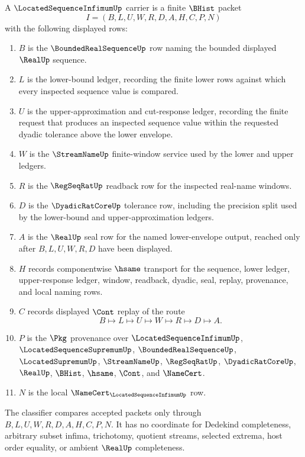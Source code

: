 \begin{definition}
\label{def:located-sequence-infimum-carrier}
A $\LocatedSequenceInfimumUp$ carrier is a finite $\BHist$ packet
$$
I=(B,L,U,W,R,D,A,H,C,P,N)
$$
with the following displayed rows:
\begin{enumerate}
\item $B$ is the $\BoundedRealSequenceUp$ row naming the bounded displayed $\RealUp$ sequence.
\item $L$ is the lower-bound ledger, recording the finite lower rows against which every inspected sequence value is compared.
\item $U$ is the upper-approximation and cut-response ledger, recording the finite request that produces an inspected sequence value within the requested dyadic tolerance above the lower envelope.
\item $W$ is the $\StreamNameUp$ finite-window service used by the lower and upper ledgers.
\item $R$ is the $\RegSeqRatUp$ readback row for the inspected real-name windows.
\item $D$ is the $\DyadicRatCoreUp$ tolerance row, including the precision split used by the lower-bound and upper-approximation ledgers.
\item $A$ is the $\RealUp$ seal row for the named lower-envelope output, reached only after $B,L,U,W,R,D$ have been displayed.
\item $H$ records componentwise $\hsame$ transport for the sequence, lower ledger, upper-response ledger, window, readback, dyadic, seal, replay, provenance, and local naming rows.
\item $C$ records displayed $\Cont$ replay of the route
$$
B \longmapsto L \longmapsto U \longmapsto W \longmapsto R \longmapsto D \longmapsto A .
$$
\item $P$ is the $\Pkg$ provenance over $\LocatedSequenceInfimumUp$, $\LocatedSequenceSupremumUp$, $\BoundedRealSequenceUp$, $\LocatedSupremumUp$, $\StreamNameUp$, $\RegSeqRatUp$, $\DyadicRatCoreUp$, $\RealUp$, $\BHist$, $\hsame$, $\Cont$, and $\NameCert$.
\item $N$ is the local $\NameCert_{\LocatedSequenceInfimumUp}$ row.
\end{enumerate}
The classifier compares accepted packets only through $B,L,U,W,R,D,A,H,C,P,N$. It has no coordinate for Dedekind completeness, arbitrary subset infima, trichotomy, quotient streams, selected extrema, host order equality, or ambient $\RealUp$ completeness.
\end{definition}

